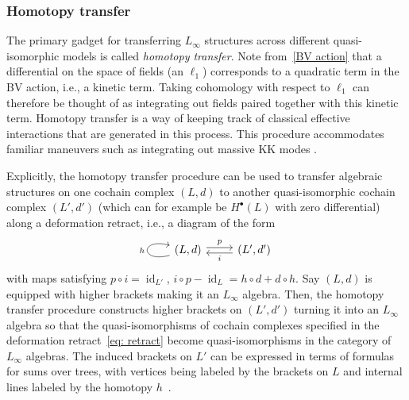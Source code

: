 \documentclass[pdftex]{sigma}
\numberwithin{equation}{section}
\theoremstyle{definition}
\DeclareMathOperator{\id}{id}
\begin{document}
\subsubsection{Homotopy transfer}
The primary gadget for transferring $L_{\infty}$ structures across different quasi-isomorphic models is called \textit{homotopy transfer}. Note from~\eqref{BV action} that a differential on the space of fields (an $\ell_1$) corresponds to a quadratic term in the BV action, i.e., a kinetic term. Taking cohomology with respect to $\ell_1$ can therefore be thought of as integrating out fields paired together with this kinetic term. Homotopy transfer is a way of keeping track of classical effective interactions that are generated in this process. This procedure accommodates familiar maneuvers such as integrating out massive KK modes \cite{Zeng:2023qqp}.

Explicitly, the homotopy transfer procedure can be used to transfer algebraic structures on one cochain complex $(L,d)$ to another quasi-isomorphic cochain complex $(L' ,d')$ (which can for example be $H^\bullet(L)$ with zero differential) along a deformation retract, i.e., a diagram of the form%
\begin{equation}
\begin{tikzcd}
	\arrow[loop left]{l}{h}(L , d )\arrow[r, shift left, "p"] & (L' , d')\arrow[l, shift left, "i"]
	\end{tikzcd}\label{eq: retract}
\end{equation}
with maps satisfying
$
 p \circ i = \id_{L'} $, $ i \circ p - \id_L = h \circ d + d \circ h$.
Say $(L,d)$ is equipped with higher brackets making it an $L_\infty$ algebra. Then, the homotopy transfer procedure constructs higher brackets on $(L',d')$ turning it into an $L_\infty$ algebra so that the quasi-isomorphisms of cochain complexes specified in the deformation retract~\eqref{eq: retract} become quasi-isomorphisms in the category of $L_\infty$ algebras. The induced brackets on $L'$ can be expressed in terms of formulas for sums over trees, with vertices being labeled by the brackets on $L$ and internal lines labeled by the homotopy $h$~\cite{LodayVallette}.
\end{document}
